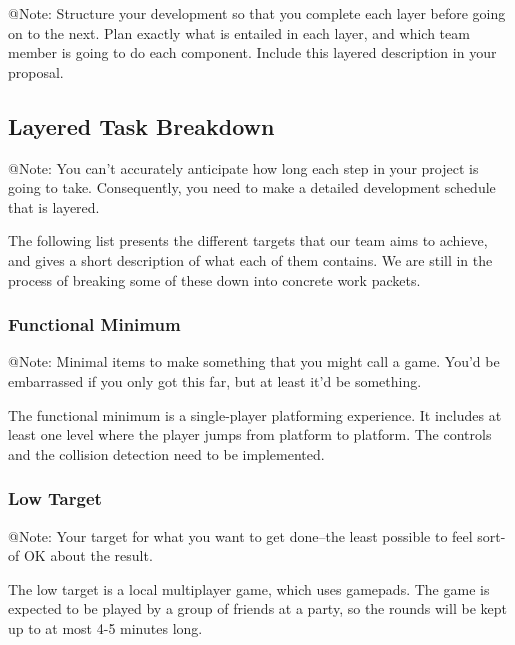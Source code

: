 \begin{TempText}
	@Note: Structure your development so that you complete each layer before going on to the next. Plan exactly what is entailed in each layer, and which team member is going to do each component. Include this layered description in your proposal.
\end{TempText}

\subsection{Layered Task Breakdown}

\begin{TempText}
	@Note: You can't accurately anticipate how long each step in your project is going to take. Consequently, you need to make a detailed development schedule that is layered.
\end{TempText}

The following list presents the different targets that our team aims to achieve, and gives a short description of what each of them contains. We are still in the process of breaking some of these down into concrete work packets.

\subsubsection{Functional Minimum}

\begin{TempText}
	@Note: Minimal items to make something that you might call a game. You'd be embarrassed if you only got this far, but at least it'd be something.
\end{TempText}

The functional minimum is a single-player platforming experience. It includes at least one level where the player jumps from platform to platform. The controls and the collision detection need to be implemented.

\subsubsection{Low Target}

\begin{TempText}
	@Note: Your target for what you want to get done--the least possible to feel sort-of OK about the result.
\end{TempText}

The low target is a local multiplayer game, which uses gamepads. The game is expected to be played by a group of friends at a party, so the rounds will be kept up to at most 4-5 minutes long.
    
